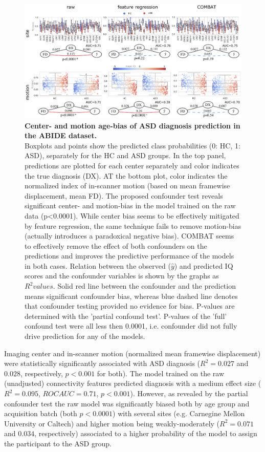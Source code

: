 \documentclass{article}
\begin{document}
\begin{figure}[!b]
  \centering
  \includegraphics[width=0.75\paperwidth]{fig/fig_abide.eps}
  \caption{\textbf{Center- and motion age-bias of ASD diagnosis prediction in the ABIDE dataset.} \\
  Boxplots and points show the predicted class probabilities (0: HC, 1: ASD), separately for the HC and ASD groups. In the top panel, predictions are plotted for each center separately and color indicates the true diagnosis (DX). AT the bottom plot, color indicates the normalized index of in-scanner motion (based on mean framewise displacement, mean FD). The proposed confounder test reveals significant center- and motion-bias in the model trained on the raw data (p<0.0001). While center bias seems to be effectively mitigated by feature regression, the same technique fails to remove motion-bias (actually introduces a paradoxical negative bias). COMBAT seems to effectively remove the effect of both confounders on the predictions and improves the predictive performance of the models in both cases.
  Relation between the observed ($\hat{y}$) and predicted IQ scores and the confounder variables is shown by the graphs as $R^2 values$. Solid red line between the confounder and the prediction means significant confounder bias, whereas blue dashed line denotes that confounder testing provided no evidence for bias. P-values are determined with the 'partial confound test'. P-values of the 'full' confound test were all less then 0.0001, i.e. confounder did not fully drive prediction for any of the models.
  }
  \label{fig:abide}
\end{figure}

Imaging center and in-scanner motion (normalized mean framewise displacement) were statistically significantly associated with ASD diagnosis ($R^2=0.027$ and $0.028$, respectively, $p<0.001$ for both). The model trained on the raw (unadjusted) connectivity features predicted diagnosis with a medium effect size ($R^2=0.095$, $ROC AUC = 0.71$, $p<0.001$).
However, as revealed by the partial confounder test the raw model was significantly biased both by age group and acquisition batch (both $p<0.0001$) with several sites (e.g. Carnegine Mellon University or Caltech) and higher motion being weakly-moderately ($R^2=0.071$ and $0.034$, respectively) associated to a higher probability of the model to assign the participant to the ASD group.
\end{document}

